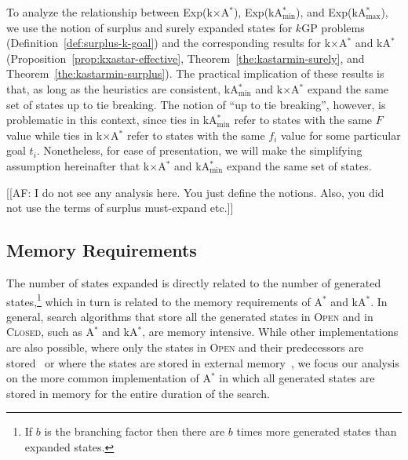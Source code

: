 \documentclass[twoside,11pt]{article}
\newcommand{\kgs}{$k$GP\xspace}
\newcommand{\astar}{A$^*$\xspace}
\newcommand{\kastar}{kA$^*$\xspace}
\newcommand{\kastarvar}[1]{\textup{kA}$^*_{#1}$\xspace}
\newcommand{\kastarmin}{\kastarvar{\min}}
\newcommand{\kastarmax}{\kastarvar{\max}}
\newcommand{\kxastar}{k$\times$A$^*$\xspace}
\newcommand{\open}{\textsc{Open}\xspace}
\newcommand{\closed}{\textsc{Closed}\xspace}
\begin{document}
To analyze the relationship between Exp(\kxastar), Exp(\kastarmin), and Exp(\kastarmax), we use the notion of surplus and surely expanded states for \kgs problems (Definition~\ref{def:surplus-k-goal}) and the corresponding results for \kxastar and \kastar (Proposition~\ref{prop:kxastar-effective}, Theorem~\ref{the:kastarmin-surely}, and Theorem~\ref{the:kastarmin-surplus}).
The practical implication of these results is that, as long as the heuristics are consistent, \kastarmin and \kxastar expand the same set of states up to tie breaking.
The notion of ``up to tie breaking'', however, is problematic in this context, since ties in \kastarmin refer to states with the same $F$ value while ties in \kxastar refer to states with the same $f_i$ value for some particular goal $t_i$.
Nonetheless, for ease of presentation, we will make the simplifying assumption hereinafter that \kxastar and \kastarmin expand the same set of states.


[[AF: I do not see any analysis here. You just define the notions. Also, you did not use the terms of surplus must-expand etc.]]



\subsection{Memory Requirements}
The number of states expanded is directly related to the number of generated states,\footnote{If $b$ is the branching factor then there are $b$ times more generated states than expanded states.} which in turn is related to the memory requirements of \astar and \kastar.
In general, search algorithms that store all the generated states in \open and in \closed, such as \astar and \kastar, are memory intensive.
While other implementations are also possible, where only the states in \open and their predecessors are stored~\cite{zhou2006breadth,korf2004best} or where the states are stored in external memory~\cite{zhou2004structured,edelkamp2016external,edelkamp2005external}, we focus our analysis on the more common implementation of \astar in which all generated states are stored in memory for the entire duration of the search.
\end{document}
